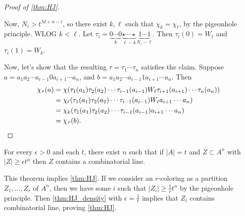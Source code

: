 \begin{proof}[Proof of \cref{thm:HJ}]
\begin{figure*}[ht]
\begin{center}
\end{center}
\caption{An illustration of how $\chi_k$ acts on words in $A^{M+n-i}$. First, we write such a word as $x_1\dotsm x_m y_{i+1}\dotsm y_n$ where $x_j \in A^{N_j}$ (for $j\in [i-1]$) and $y_j \in A$ (for $j=i+1,\dotsc,n$). Then, $\chi_k$ acts on such a word by creating a word of size $A^N$ as follows, which it plugs into $\chi$.  First, $x_1,\dotsc,x_m$ are not modified (visualized by empty slots of the appropriate size in the figure). Then  the word $W_k \in A^{N_i}$ is concatenated, followed by $\tau_{j}(y_j) \in A^{N_j}$ for $j= i+1,\dotsc,n$.} \label{fig:vdwWk}
\end{figure*}
Now, $N_i > t^{M+n - i}$, so there exist $k,\ell$ such that $\chi_k = \chi_\ell$, by the pigeonhole principle. WLOG $k< \ell$. Let $\tau_i = \underbrace{0\dotsm0}_k \underbrace{\star\dotsm\star}_{\ell-k} \underbrace{1\dotsm 1}_{N_i - \ell}$. Then $\tau_i(0) = W_\ell$ and $\tau_i(1) = W_k$.

Now, let's show that the resulting $\tau = \tau_1\dotsm \tau_n$ satisfies the claim. Suppose $a = a_1a_2\dotsm a_{i-1} 0 a_{i+1} \dotsm a_n$, and $b =a_1a_2\dotsm a_{i-1} 1 a_{i+1} \dotsm a_n$. Then 
\begin{align*}	
\chi_\tau(a) &= \chi(\tau_1(a_1)\tau_2(a_2)\dotsm \tau_{i-1}(a_{i-1})W_\ell \tau_{i+1}(a_{i+1})\dotsm \tau_n(a_n)) \\
&= \chi_\ell (\tau_1(a_1)\tau_2(a_2)\dotsm \tau_{i-1}(a_{i-1})W_\ell a_{i+1}\dotsm a_n)\\
&= \chi_k (\tau_1(a_1)\tau_2(a_2)\dotsm \tau_{i-1}(a_{i-1}) a_{i+1}\dotsm a_n)\\
&= \chi_\tau(b).\qedhere
\end{align*}
\end{proof}
\begin{theorem} \label{thm:HJ_density}
For every $\epsilon>0$ and each $t$, there exist $n$ such that if $|A| = t$ and $Z \subset A^n$ with $|Z| \geq \epsilon t^n$ then $Z$ contains a combinatorial line.
\end{theorem}
\begin{remark}
This theorem implies \cref{thm:HJ}. If we consider an $r$-coloring as a partition $Z_1,\dotsc,Z_r$ of $A^n$, then we have some $i$ such that $|Z_i| \geq \frac{1}{r}t^n$ by the pigeonhole principle. Then \cref{thm:HJ_density} with $\epsilon= \frac{1}{r}$ implies that $Z_i$ contains  combinatorial line, proving \cref{thm:HJ}.
\end{remark}

